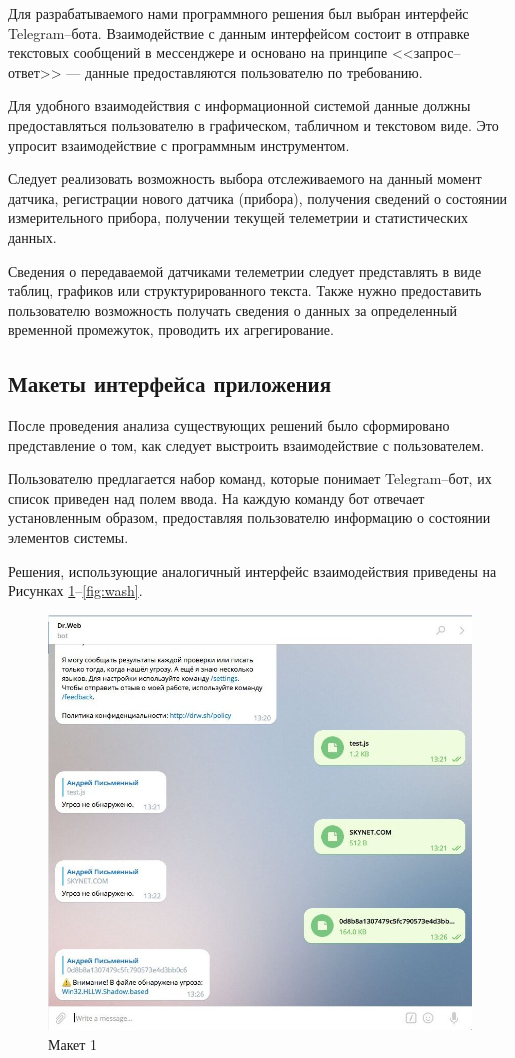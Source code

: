 \documentclass[a4paper,14pt]{extarticle}
\begin{document}
Для разрабатываемого нами программного решения был выбран интерфейс \mbox{Telegram--бота}. Взаимодействие с данным интерфейсом состоит в отправке текстовых сообщений в мессенджере и основано на принципе <<запрос--ответ>> --- данные предоставляются пользователю по требованию.

Для удобного взаимодействия с информационной системой данные должны предоставляться пользователю в графическом, табличном и текстовом виде. Это упросит взаимодействие с программным инструментом.


Следует реализовать возможность выбора отслеживаемого на данный момент датчика, регистрации нового датчика (прибора), получения сведений о состоянии измерительного прибора, получении текущей телеметрии и статистических данных.

Сведения о передаваемой датчиками телеметрии следует представлять в виде таблиц, графиков или структурированного текста. Также нужно предоставить пользователю возможность получать сведения о данных за определенный временной промежуток, проводить их агрегирование.



\subsection{Макеты интерфейса приложения}

После проведения анализа существующих решений было сформировано представление о том, как следует выстроить взаимодействие с пользователем. 

Пользователю предлагается набор команд, которые понимает \mbox{Telegram--бот}, их список приведен над полем ввода. На каждую команду бот отвечает установленным образом, предоставляя пользователю информацию о состоянии элементов системы. 

Решения, использующие аналогичный интерфейс взаимодействия приведены на Рисунках \mbox{\ref{fig:drewb}--\ref{fig:wash}}.


\begin{figure}[h!]
	\centering
	\includegraphics[width=0.5\linewidth]{images/mokups/drewb}
	\caption{Макет 1}
	\label{fig:drewb}
\end{figure}
\end{document}

